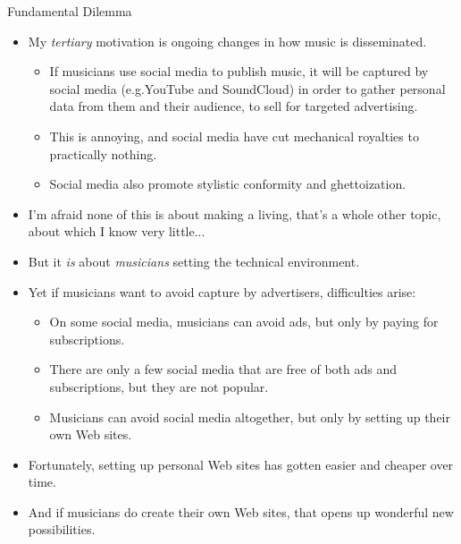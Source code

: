 \documentclass{beamer}
\begin{document}
\begin{frame}{Fundamental Dilemma}
\begin{itemize}
\item My \emph{tertiary} motivation is ongoing changes in how music is disseminated.
\begin{itemize}
\item If musicians use social media to publish music, it will be captured by social media (e.g.YouTube and SoundCloud) in order to gather personal data from them and their audience, to sell for targeted advertising.
\item This is annoying, and social media have cut mechanical royalties to practically nothing.
\item Social media also promote stylistic conformity and ghettoization.
\end{itemize}
\item I'm afraid none of this is about making a living, that's a whole other topic, about which I know very little...
\item But it \emph{is} about \emph{musicians} setting the technical environment.
\end{itemize}
\end{frame}

\begin{frame}{}
\begin{itemize}
\item Yet if musicians want to avoid capture by advertisers, difficulties arise:
\begin{itemize}
\item On some social media, musicians can avoid ads, but only by paying for subscriptions.
\item There are only a few social media that are free of both ads and subscriptions, but they are not popular.
\item Musicians can avoid social media altogether, but only by setting up their own Web sites.
\end{itemize}
\item Fortunately, setting up personal Web sites has gotten easier and cheaper over time.
\item And if musicians do create their own Web sites, that opens up wonderful new possibilities.
\end{itemize}
\end{frame}
\end{document}
